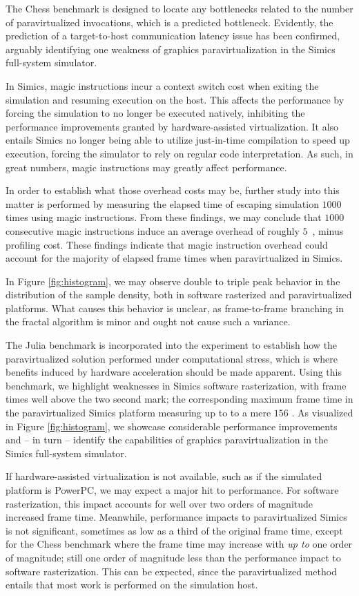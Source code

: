 The Chess benchmark is designed to locate any bottlenecks related to the number of paravirtualized invocations, which is a predicted bottleneck.
Evidently, the prediction of a target-to-host communication latency issue has been confirmed, arguably identifying one weakness of graphics paravirtualization in the Simics full-system simulator.

In Simics, magic instructions incur a context switch cost when exiting the simulation and resuming execution on the host.
This affects the performance by forcing the simulation to no longer be executed natively, inhibiting the performance improvements granted by hardware-assisted virtualization.
It also entails Simics no longer being able to utilize just-in-time compilation to speed up execution, forcing the simulator to rely on regular code interpretation.
As such, in great numbers, magic instructions may greatly affect performance.

In order to establish what those overhead costs may be, further study into this matter is performed by measuring the elapsed time of escaping simulation $1000$ times using magic instructions.
From these findings, we may conclude that $1000$ consecutive magic instructions induce an average overhead of roughly $5$~\milli\second , minus profiling cost.
These findings indicate that magic instruction overhead could account for the majority of elapsed frame times when paravirtualized in Simics.

In Figure \ref{fig:histogram}, we may observe double to triple peak behavior in the distribution of the sample density, both in software rasterized and paravirtualized platforms.
What causes this behavior is unclear, as frame-to-frame branching in the fractal algorithm is minor and ought not cause such a variance.

The Julia benchmark is incorporated into the experiment to establish how the paravirtualized solution performed under computational stress, which is where benefits induced by hardware acceleration should be made apparent.
Using this benchmark, we highlight weaknesses in Simics software rasterization, with frame times well above the two second mark; the corresponding maximum frame time in the paravirtualized Simics platform measuring up to to a mere $156$ \milli\second .
As visualized in Figure \ref{fig:histogram}, we showcase considerable performance improvements and -- in turn -- identify the capabilities of graphics paravirtualization in the Simics full-system simulator.

If hardware-assisted virtualization is not available, such as if the simulated platform is PowerPC, we may expect a major hit to performance.
For software rasterization, this impact accounts for well over two orders of magnitude increased frame time.
Meanwhile, performance impacts to paravirtualized Simics is not significant, sometimes as low as a third of the original frame time, except for the Chess benchmark where the frame time may increase with \textit{up to} one order of magnitude; still one order of magnitude less than the performance impact to software rasterization.
This can be expected, since the paravirtualized method entails that most work is performed on the simulation host.

